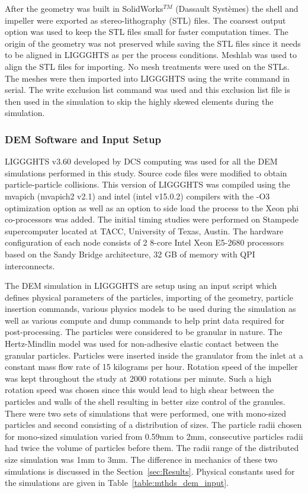 \documentclass[preprint,11pt,authoryear]{elsarticle}
\begin{document}
After the geometry was built in SolidWorks$^{TM}$ (Dassault Syst\`{e}mes) the shell and impeller 
were exported as stereo-lithography (STL) files. The coarsest output option was used to keep the 
STL files small for faster computation times. The origin of the geometry was not preserved 
while saving the STL files since it needs to be aligned in LIGGGHTS as per the process conditions. 
Meshlab was used to align the STL files for importing. No mesh treatments were used on the STLs. 
The meshes were then imported into LIGGGHTS using the write command in serial. 
The write exclusion list command was used and this exclusion list file is then used in the 
simulation to skip the highly skewed elements during the simulation. 


\subsubsection{DEM Software and Input Setup}
LIGGGHTS v3.60 developed by DCS computing was used for all the DEM simulations 
performed in this study. Source code files were modified to obtain particle-particle 
collisions. This version of LIGGGHTS was compiled using the mvapich (mvapich2 v2.1) 
and intel (intel v15.0.2) compilers with the -O3 optimization option as well as an 
option to side load the process to the Xeon phi co-processors was added. The 
initial timing studies were performed on Stampede supercomputer located at TACC, 
University of Texas, Austin. The hardware configuration of each node consists 
of 2 8-core Intel Xeon E5-2680 processors based on the Sandy Bridge architecture, 
32 GB of memory with QPI interconnects.

The DEM simulation in LIGGGHTS are setup using an input script which defines physical 
parameters of the particles, importing of the geometry, particle insertion commands, various physics 
models to be used during the simulation as well as various compute and dump commands to help print 
data required for post-processing. The particles were considered to be granular in 
nature. The Hertz-Mindlin model was used for non-adhesive elastic contact between 
the granular particles. 
Particles were inserted inside the granulator from the inlet at a constant mass flow rate of 15 
kilograms per hour. Rotation speed of the impeller was kept throughout the study at 2000 rotations 
per minute. Such a high rotation speed was chosen since this would lead to high shear between the 
particles and walls of the shell resulting in better size control of the granules. 
There were two sets of 
simulations that were performed, one with mono-sized particles and second consisting 
of a distribution 
of sizes. The particle radii chosen for mono-sized simulation varied from 0.59mm to 2mm, consecutive 
particles radii had twice the volume of particles before them. The radii range of the distributed 
size simulation was 1mm to 3mm. The difference in mechanics of these two simulations is discussed 
in the Section~\ref{sec:Results}. Physical constants used for the simulations are given in 
Table~\ref{table:mthds_dem_input}.
\end{document}
